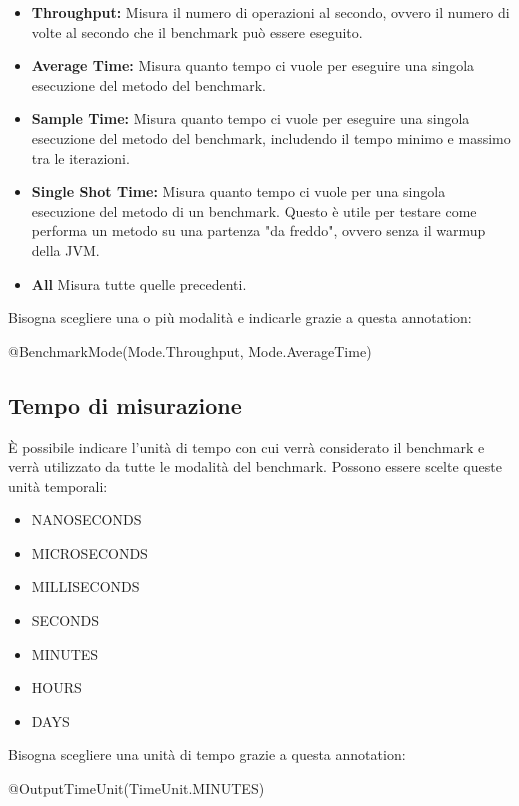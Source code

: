 \documentclass[a4paper, 11pt,            %
openright,               %
italian,
english                 
]{article}       %
\begin{document}
	\begin{itemize}
		\item \textbf{Throughput: } Misura il numero di operazioni al secondo, ovvero il numero di volte al secondo che il benchmark può essere eseguito. 
		\item \textbf{Average Time: } Misura quanto tempo ci vuole per eseguire una singola esecuzione del metodo del benchmark. 
		\item \textbf{Sample Time: } Misura quanto tempo ci vuole per eseguire una singola esecuzione del metodo del benchmark, includendo il tempo minimo e massimo tra le iterazioni.
		\item \textbf{Single Shot Time: } Misura quanto tempo ci vuole per una singola esecuzione del metodo di un benchmark. Questo è utile per testare come performa un metodo su una partenza "da freddo", ovvero senza il warmup della JVM. 
		\item \textbf{All} Misura tutte quelle precedenti.
	\end{itemize}
	Bisogna scegliere una o più modalità e indicarle grazie a questa annotation:
	\begin{center}
		@BenchmarkMode({Mode.Throughput, Mode.AverageTime})
	\end{center}
	
	\subsection{Tempo di misurazione}
	È possibile indicare l'unità di tempo con cui verrà considerato il benchmark e verrà utilizzato da tutte le modalità del benchmark. Possono essere scelte queste unità temporali:
	\begin{itemize}
		\item NANOSECONDS
		\item MICROSECONDS
		\item MILLISECONDS
		\item SECONDS
		\item MINUTES
		\item HOURS
		\item DAYS
	\end{itemize}
	Bisogna scegliere una unità di tempo grazie a questa annotation: 
	\begin{center}
		@OutputTimeUnit(TimeUnit.MINUTES)
	\end{center}
	
\end{document}
